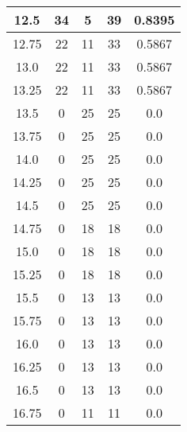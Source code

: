\documentclass[letterpaper, 12pt]{article}
\begin{document}
\begin{longtable}{|c|c|c|c|c|}
12.5 & 34 & 5 & 39 & 0.8395 \\
\hline
12.75 & 22 & 11 & 33 & 0.5867 \\
\hline
13.0 & 22 & 11 & 33 & 0.5867 \\
\hline
13.25 & 22 & 11 & 33 & 0.5867 \\
\hline
13.5 & 0 & 25 & 25 & 0.0 \\
\hline
13.75 & 0 & 25 & 25 & 0.0 \\
\hline
14.0 & 0 & 25 & 25 & 0.0 \\
\hline
14.25 & 0 & 25 & 25 & 0.0 \\
\hline
14.5 & 0 & 25 & 25 & 0.0 \\
\hline
14.75 & 0 & 18 & 18 & 0.0 \\
\hline
15.0 & 0 & 18 & 18 & 0.0 \\
\hline
15.25 & 0 & 18 & 18 & 0.0 \\
\hline
15.5 & 0 & 13 & 13 & 0.0 \\
\hline
15.75 & 0 & 13 & 13 & 0.0 \\
\hline
16.0 & 0 & 13 & 13 & 0.0 \\
\hline
16.25 & 0 & 13 & 13 & 0.0 \\
\hline
16.5 & 0 & 13 & 13 & 0.0 \\
\hline
16.75 & 0 & 11 & 11 & 0.0 \\
\hline
\end{longtable}
\end{document}
